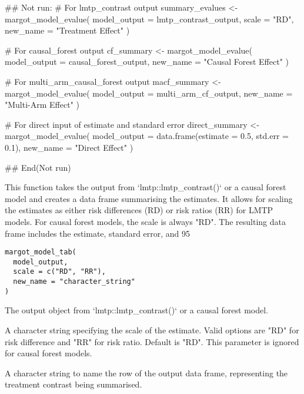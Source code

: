 \documentclass[a4paper]{book}
\begin{document}
%
\begin{Examples}
\begin{ExampleCode}
## Not run: 
# For lmtp_contrast output
summary_evalues <- margot_model_evalue(
  model_output = lmtp_contrast_output,
  scale = "RD",
  new_name = "Treatment Effect"
)

# For causal_forest output
cf_summary <- margot_model_evalue(
  model_output = causal_forest_output,
  new_name = "Causal Forest Effect"
)

# For multi_arm_causal_forest output
macf_summary <- margot_model_evalue(
  model_output = multi_arm_cf_output,
  new_name = "Multi-Arm Effect"
)

# For direct input of estimate and standard error
direct_summary <- margot_model_evalue(
  model_output = data.frame(estimate = 0.5, std.err = 0.1),
  new_name = "Direct Effect"
)

## End(Not run)

\end{ExampleCode}
\end{Examples}
%
\begin{Description}
This function takes the output from `lmtp::lmtp\_contrast()` or a causal forest model and creates a data frame summarising the
estimates. It allows for scaling the estimates as either risk differences (RD) or risk ratios (RR) for LMTP models.
For causal forest models, the scale is always "RD".
The resulting data frame includes the estimate, standard error, and 95
\end{Description}
%
\begin{Usage}
\begin{verbatim}
margot_model_tab(
  model_output,
  scale = c("RD", "RR"),
  new_name = "character_string"
)
\end{verbatim}
\end{Usage}
%
\begin{Arguments}
\begin{ldescription}
\item[\code{model\_output}] The output object from `lmtp::lmtp\_contrast()` or a causal forest model.

\item[\code{scale}] A character string specifying the scale of the estimate. Valid options are "RD" for risk
difference and "RR" for risk ratio. Default is "RD". This parameter is ignored for causal forest models.

\item[\code{new\_name}] A character string to name the row of the output data frame, representing the treatment
contrast being summarised.
\end{ldescription}
\end{Arguments}
\end{document}

